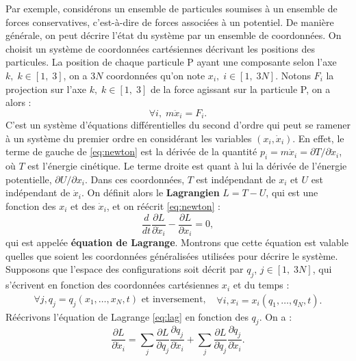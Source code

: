 Par exemple, considérons un ensemble de particules soumises à un ensemble de forces conservatives, c'est-à-dire de forces associées à un potentiel. De manière générale, on peut décrire l'état du système par un ensemble de coordonnées. On choisit un système de coordonnées cartésiennes décrivant les positions des particules. La position de chaque particule P ayant une composante selon l'axe $k,\;k\in[1,\;3]$, on a $3N$ coordonnées qu'on note $x_i,\; i\in[1,\;3N]$. Notons $F_i$ la projection sur l'axe $k,\;k\in[1,\;3]$ de la force agissant sur la particule P, on a alors :
\begin{equation}
\label{eq:newton}
\forall i,\;m\ddot{x}_i = F_i.
\end{equation}
C'est un système d'équations différentielles du second d'ordre qui peut se ramener à un système du premier ordre en considérant les variables $(x_i,\dot{x}_i)$. En effet, le terme de gauche de \ref{eq:newton} est la dérivée de la quantité
$p_i=m\dot{x}_i=\partial T/\partial\dot{x}_i$, où $T$ est l'énergie cinétique. Le terme droite est quant à lui la dérivée de l'énergie potentielle, $\partial U/\partial x_i$. Dans ces coordonnées, $T$ est indépendant de $x_i$ et $U$ est indépendant de $\dot{x}_i$. On définit alors le \textbf{Lagrangien} $L=T-U$, qui est une fonction des $x_i$ et des $\dot{x}_i$, et on réécrit \ref{eq:newton} :
\begin{equation}
\label{eq:lag}
\frac{d}{dt}\frac{\partial L}{\partial \dot{x}_i}-\frac{\partial L}{\partial x_i}=0,
\end{equation}
qui est appelée \textbf{équation de Lagrange}. Montrons que cette équation est valable quelles que soient les coordonnées généralisées utilisées pour décrire le système. Supposons que l'espace des configurations soit décrit par ${q_j}$, $j\in[1,\;3N]$, qui s'écrivent en fonction des coordonnées cartésiennes ${x_i}$ et du temps :
\begin{equation}
\begin{split}
\forall j, q_j=q_j(x_1,\ldots,x_N,t)\text{ et inversement, }
\end{split}
\begin{split}
\forall i, x_i=x_i(q_1,\ldots,q_N,t).
\end{split}
\end{equation}
Réécrivons l'équation de Lagrange \ref{eq:lag} en fonction des ${q_j}$. On a : 
\begin{equation}
\label{eq:lag1}
\frac{\partial L}{\partial \dot{x}_i} = \sum_j \frac{\partial L}{\partial q_j} \frac{\partial q_j}{\partial \dot{x}_i}+ \sum_j\frac{\partial L}{\partial \dot{q}_j}\frac{\partial \dot{q}_j}{\partial \dot{x}_i}.
\end{equation}
